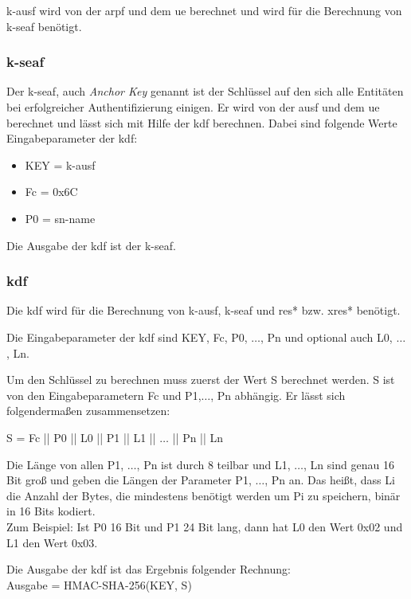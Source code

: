 \gls{k-ausf} wird von der \gls{arpf} und dem \gls{ue} berechnet und wird für die Berechnung von \gls{k-seaf} benötigt.

\subsubsection{\gls{k-seaf}}
Der \gls{k-seaf}, auch \textit{Anchor Key} genannt ist der Schlüssel auf den sich alle Entitäten bei erfolgreicher Authentifizierung einigen. %
Er wird von der \gls{ausf} und dem \gls{ue} berechnet und lässt sich mit Hilfe der \gls{kdf} berechnen.
Dabei sind folgende Werte Eingabeparameter der \gls{kdf}: %
\begin{itemize}
\item KEY = \gls{k-ausf}
\item Fc = 0x6C
\item P0 = \gls{sn-name}
\end{itemize}
Die Ausgabe der \gls{kdf} ist der \gls{k-seaf}.

\subsubsection{\gls{kdf}}
Die \gls{kdf} wird für die Berechnung von \gls{k-ausf}, \gls{k-seaf} und \gls{res*} bzw. \gls{xres*} benötigt.

Die Eingabeparameter der \gls{kdf} sind KEY, Fc, P0, $ \dots $, Pn und optional auch L0, $ \dots $, Ln.

Um den Schlüssel zu berechnen muss zuerst der Wert S berechnet werden. %
S ist von den Eingabeparametern Fc und P1,$ \dots $, Pn abhängig.
Er l\"asst sich folgendermaßen zusammensetzen: 

S = Fc || P0 || L0 || P1 || L1 || $ \dots $ || Pn || Ln 

Die Länge von allen P1, $ \dots $, Pn ist durch 8 teilbar und L1, $ \dots $, Ln sind genau 16 Bit groß und geben die Längen der Parameter P1, $ \dots $, Pn an. 
Das heißt, dass Li die Anzahl der Bytes, die mindestens benötigt werden um Pi zu speichern, binär in 16 Bits kodiert. \\
Zum Beispiel: Ist P0 16 Bit und P1 24 Bit lang, dann hat L0 den Wert 0x02 und L1 den Wert 0x03.

Die Ausgabe der \gls{kdf} ist das Ergebnis folgender Rechnung: \\
Ausgabe = HMAC-SHA-256(KEY, S) \\

